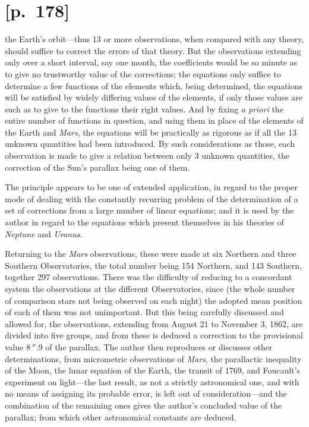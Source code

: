 \documentclass[11pt]{article}
\begin{document}
\section*{[p.~178]}
the Earth's orbit---thus 13 or more observations, when compared with any theory,
should suffice to correct the errors of that theory. But the observations extending
only over a short interval, say one month, the coefficients would be so minute as to
give no trustworthy value of the corrections; the equations only suffice to determine
a few functions of the elements which, being determined, the equations will be satisfied
by widely differing values of the elements, if only those values are such as to give
to the functions their right values. And by fixing \textit{a priori} the entire number of
functions in question, and using them in place of the elements of the Earth and
\textit{Mars}, the equations will be practically as rigorous as if all the 13 unknown quantities
had been introduced. By such considerations as those, each observation is made to
give a relation between only 3 unknown quantities, the correction of the Sun's parallax
being one of them.

The principle appears to be one of extended application, in regard to the proper
mode of dealing with the constantly recurring problem of the determination of a set
of corrections from a large number of linear equations; and it is used by the author
in regard to the equations which present themselves in his theories of \textit{Neptune} and
\textit{Uranus}.

Returning to the \textit{Mars} observations, these were made at six Northern and three
Southern Observatories, the total number being 154 Northern, and 143 Southern, together
$297$ observations. There was the difficulty of reducing to a concordant system the
observations at the different Observatories, since (the whole number of comparison stars
not being observed on each night) the adopted mean position of each of them was
not unimportant. But this being carefully discussed and allowed for, the observations,
extending from August 21 to November 3, 1862, are divided into five groups, and
from these is deduced a correction to the provisional value $8\,''.9$ of the parallax. The
author then reproduces or discusses other determinations, from micrometric observations
of \textit{Mars}, the parallactic inequality of the Moon, the lunar equation of the Earth, the
transit of 1769, and Foucault's experiment on light---the last result, as not a strictly
astronomical one, and with no means of assigning its probable error, is left out of
consideration---and the combination of the remaining ones gives the author's concluded
value of the parallax; from which other astronomical constants are deduced.
\end{document}
